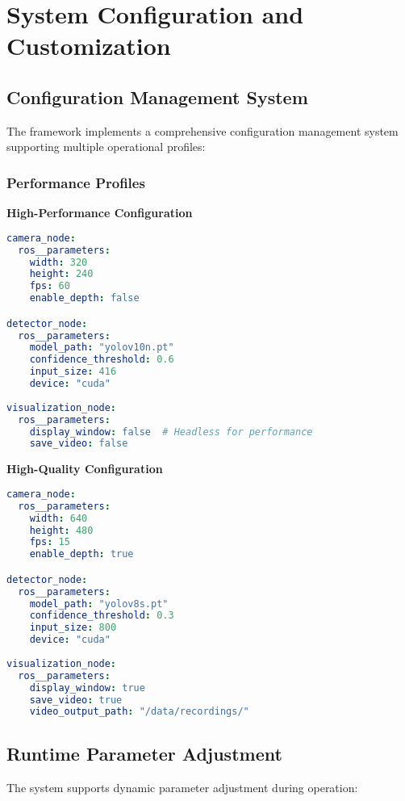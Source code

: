 \documentclass[12pt,a4paper]{article}
\begin{document}
\section{System Configuration and Customization}

\subsection{Configuration Management System}

The framework implements a comprehensive configuration management system supporting multiple operational profiles:

\subsubsection{Performance Profiles}

\textbf{High-Performance Configuration}
\begin{lstlisting}[language=yaml, caption=High-Performance Profile]
camera_node:
  ros__parameters:
    width: 320
    height: 240
    fps: 60
    enable_depth: false

detector_node:
  ros__parameters:
    model_path: "yolov10n.pt"
    confidence_threshold: 0.6
    input_size: 416
    device: "cuda"
    
visualization_node:
  ros__parameters:
    display_window: false  # Headless for performance
    save_video: false
\end{lstlisting}

\textbf{High-Quality Configuration}
\begin{lstlisting}[language=yaml, caption=High-Quality Profile]
camera_node:
  ros__parameters:
    width: 640
    height: 480
    fps: 15
    enable_depth: true

detector_node:
  ros__parameters:
    model_path: "yolov8s.pt"
    confidence_threshold: 0.3
    input_size: 800
    device: "cuda"
    
visualization_node:
  ros__parameters:
    display_window: true
    save_video: true
    video_output_path: "/data/recordings/"
\end{lstlisting}

\subsection{Runtime Parameter Adjustment}

The system supports dynamic parameter adjustment during operation:
\end{document}
